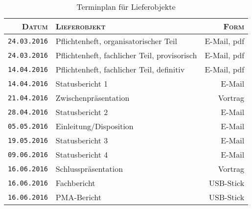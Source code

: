 \begin{table}[h!]
    \centering
    \caption{Terminplan f\"ur Lieferobjekte}
    \label{tab:lieferobj}
    \begin{tabular}{rp{80mm}r}
        \toprule
        \textsc{Datum} & \textsc{Lieferobjekt} & \textsc{Form} \\
        \midrule
        \texttt{24.03.2016} & Pflichtenheft, organisatorischer Teil         & E-Mail, pdf \\
        \texttt{24.03.2016} & Pflichtenheft, fachlicher Teil, provisorisch  & E-Mail, pdf \\
        \texttt{14.04.2016} & Pflichtenheft, fachlicher Teil, definitiv     & E-Mail, pdf \\
        \texttt{14.04.2016} & Statusbericht 1                               & E-Mail \\
        \texttt{21.04.2016} & Zwischenpr\"asentation                        & Vortrag \\
        \texttt{28.04.2016} & Statusbericht 2                               & E-Mail \\
        \texttt{05.05.2016} & Einleitung/Disposition                        & E-Mail \\
        \texttt{19.05.2016} & Statusbericht 3                               & E-Mail \\
        \texttt{09.06.2016} & Statusbericht 4                               & E-Mail \\
        \texttt{16.06.2016} & Schlusspr\"asentation                         & Vortrag \\
        \texttt{16.06.2016} & Fachbericht                                   & USB-Stick \\
        \texttt{16.06.2016} & PMA-Bericht                                   & USB-Stick \\
        \bottomrule
    \end{tabular}
\end{table}

